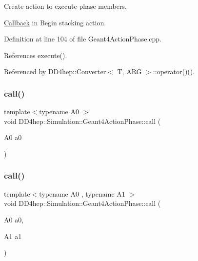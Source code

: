 Create action to execute phase members. 

\hyperlink{class_d_d4hep_1_1_callback}{Callback} in Begin stacking action. 

Definition at line 104 of file Geant4\+Action\+Phase.\+cpp.



References execute().



Referenced by D\+D4hep\+::\+Converter$<$ T, A\+R\+G $>$\+::operator()().

\hypertarget{class_d_d4hep_1_1_simulation_1_1_geant4_action_phase_a2cc1ad0196e940182ab25717bceabe57}{}\label{class_d_d4hep_1_1_simulation_1_1_geant4_action_phase_a2cc1ad0196e940182ab25717bceabe57} 
\subsubsection{\texorpdfstring{call()}{call()}\hspace{0.1cm}{\footnotesize\ttfamily [10/12]}}
{\footnotesize\ttfamily template$<$typename A0 $>$ \\
void D\+D4hep\+::\+Simulation\+::\+Geant4\+Action\+Phase\+::call (\begin{DoxyParamCaption}\item[{A0}]{a0 }\end{DoxyParamCaption})}

\hypertarget{class_d_d4hep_1_1_simulation_1_1_geant4_action_phase_aff7a51f948ba6d673b1411032096a109}{}\label{class_d_d4hep_1_1_simulation_1_1_geant4_action_phase_aff7a51f948ba6d673b1411032096a109} 
\subsubsection{\texorpdfstring{call()}{call()}\hspace{0.1cm}{\footnotesize\ttfamily [11/12]}}
{\footnotesize\ttfamily template$<$typename A0 , typename A1 $>$ \\
void D\+D4hep\+::\+Simulation\+::\+Geant4\+Action\+Phase\+::call (\begin{DoxyParamCaption}\item[{A0}]{a0,  }\item[{A1}]{a1 }\end{DoxyParamCaption})}

